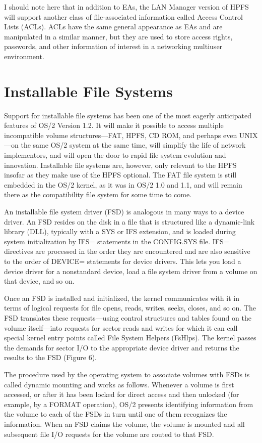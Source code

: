 I should note here that in addition to EAs, the LAN Manager version of HPFS
will support another class of file-associated information called Access
Control Lists (ACLs).  ACLs have the same general appearance as EAs and are
manipulated in a similar manner, but they are used to store access rights,
passwords, and other information of interest in a networking multiuser
environment.
 
\section{\heads Installable File Systems}
 
Support for installable file systems has been one of the most eagerly
anticipated features of OS/2 Version 1.2.  It will make it possible to access
multiple incompatible volume structures---FAT, HPFS, CD ROM, and perhaps even
UNIX---on the same OS/2 system at the same time, will simplify the life of
network implementors, and will open the door to rapid file system evolution
and innovation.  Installable file systems are, however, only relevant to the
HPFS insofar as they make use of the HPFS optional.  The FAT file system is
still embedded in the OS/2 kernel, as it was in OS/2 1.0 and 1.1, and will
remain there as the compatibility file system for some time to come.
 
An installable file system driver (FSD) is analogous in many ways to a device
driver.  An FSD resides on the disk in a file that is structured like a
dynamic-link library (DLL), typically with a SYS or IFS extension, and is
loaded during system initialization by IFS= statements in the CONFIG.SYS
file.  IFS= directives are processed in the order they are encountered and
are also sensitive to the order of DEVICE= statements for device drivers.
This lets you load a device driver for a nonstandard device, load a file
system driver from a volume on that device, and so on.
 
Once an FSD is installed and initialized, the kernel communicates with it in
terms of logical requests for file opens, reads, writes, seeks, closes, and
so on.  The FSD translates these requests---using control structures and
tables
found on the volume itself---into requests for sector reads and writes for
which it can call special kernel entry points called File System Helpers
(FsHlps).  The kernel passes the demands for sector I/O to the appropriate
device driver and returns the results to the FSD (Figure 6).
 
The procedure used by the operating system to associate volumes with FSDs is
called dynamic mounting and works as follows.  Whenever a volume is first
accessed, or after it has been locked for direct access and then unlocked
(for example, by a FORMAT operation), OS/2 presents identifying information
from the volume to each of the FSDs in turn until one of them recognizes the
information.  When an FSD claims the volume, the volume is mounted and all
subsequent file I/O requests for the volume are routed to that FSD.
 
